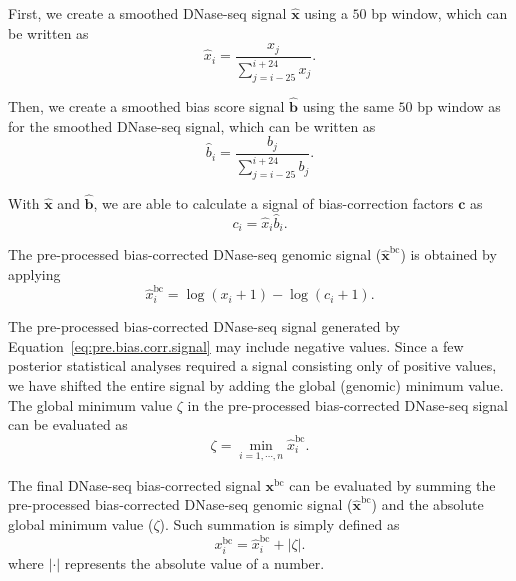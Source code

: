 First, we create a smoothed DNase-seq signal $\hat{\mathbf{x}}$ using a $50$ bp window, which can be written as
\begin{equation}
  \label{eq:smoothed.raw.dnase}
  {\hat{x}}_{i} = \frac{{x}_{j}}{\sum_{j=i-25}^{i+24} {x}_{j}}.
\end{equation}

Then, we create a smoothed bias score signal $\hat{\mathbf{b}}$ using the same $50$ bp window as for the smoothed DNase-seq signal, which can be written as
\begin{equation}
  \label{eq:smoothed.bias.signal}
  {\hat{b}}_{i} = \frac{{b}_{j}}{\sum_{j=i-25}^{i+24} {b}_{j}}.
\end{equation}

With $\hat{\mathbf{x}}$ and $\hat{\mathbf{b}}$, we are able to calculate a signal of bias-correction factors $\mathbf{c}$ as
\begin{equation}
  \label{eq:bias.corr}
  {c}_{i} = {\hat{x}}_{i} {\hat{b}}_{i}.
\end{equation}

The pre-processed bias-corrected DNase-seq genomic signal ($\hat{\mathbf{x}}^{\text{bc}}$) is obtained by applying
\begin{equation}
  \label{eq:pre.bias.corr.signal}
  {\hat{x}}_{i}^{\text{bc}} = \log({x}_{i} + 1) - \log({c}_{i} + 1).
\end{equation}

The pre-processed bias-corrected DNase-seq signal generated by Equation~\ref{eq:pre.bias.corr.signal} may include negative values. Since a few posterior statistical analyses required a signal consisting only of positive values, we have shifted the entire signal by adding the global (genomic) minimum value. The global minimum value $\zeta$ in the pre-processed bias-corrected DNase-seq signal can be evaluated as
\begin{equation}
  \label{eq:pre.dnase.corr.min}
  \zeta = \min_{i = 1, \cdots, n} {\hat{x}}_{i}^{\text{bc}}.
\end{equation}

The final DNase-seq bias-corrected signal $\mathbf{x}^{\text{bc}}$ can be evaluated by summing the pre-processed bias-corrected DNase-seq genomic signal ($\hat{\mathbf{x}}^{\text{bc}}$) and the absolute global minimum value ($\zeta$). Such summation is simply defined as
\begin{equation}
  \label{eq:bias.corr.signal}
  {x}_{i}^{\text{bc}} = {\hat{x}}_{i}^{\text{bc}} + |\zeta| .
\end{equation}
where $|\cdot|$ represents the absolute value of a number.

